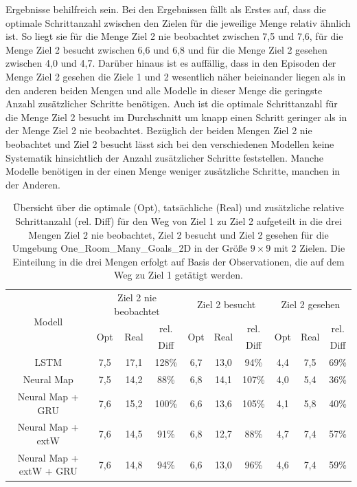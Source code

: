 Ergebnisse behilfreich sein. Bei den Ergebnissen fällt als Erstes auf, dass die optimale Schrittanzahl zwischen den Zielen für die jeweilige Menge relativ ähnlich ist. So liegt sie für die Menge \glqq Ziel 2 nie beobachtet\grqq{} zwischen 7,5 und 7,6, für die Menge \glqq Ziel 2 besucht\grqq{} zwischen 6,6 und 6,8 und für die Menge \glqq Ziel 2 gesehen\grqq{} zwischen 4,0 und 4,7. Darüber hinaus ist es auffällig, dass in den Episoden der Menge \glqq Ziel 2 gesehen\grqq{} die Ziele 1 und 2 wesentlich näher beieinander liegen als in den anderen beiden Mengen und alle Modelle in dieser Menge die geringste Anzahl zusätzlicher Schritte benötigen. Auch ist die optimale Schrittanzahl für die Menge \glqq Ziel 2 besucht\grqq{} im Durchschnitt um knapp einen Schritt geringer als in der Menge \glqq Ziel 2 nie beobachtet\grqq{}. Bezüglich der beiden Mengen \glqq Ziel 2 nie beobachtet\grqq{} und \glqq Ziel 2 besucht\grqq{} lässt sich bei den verschiedenen Modellen keine Systematik hinsichtlich der Anzahl zusätzlicher Schritte feststellen. Manche Modelle benötigen in der einen Menge weniger zusätzliche Schritte, manchen in der Anderen.

\begin{table}
  \begin{tabular}{|c|c|c|c|c|c|c|c|c|c|}
    \hline
    \multirow{3}{*}{Modell} & \multicolumn{3}{|c|}{Ziel 2 nie beobachtet} & \multicolumn{3}{|c|}{Ziel 2 besucht} & \multicolumn{3}{|c|}{Ziel 2 gesehen} \\ \cline{2-10}
    & \multirow{2}{*}{Opt} & \multirow{2}{*}{Real} & rel. & \multirow{2}{*}{Opt} & \multirow{2}{*}{Real} & rel. & \multirow{2}{*}{Opt} & \multirow{2}{*}{Real} & rel. \\
    & & & Diff & & & Diff & & & Diff \\ \hline
    LSTM & 7,5 & 17,1 & 128\% & 6,7 & 13,0 & 94\% & 4,4 & 7,5 & 69\% \\ \hline
    Neural Map & 7,5 & 14,2 & 88\% & 6,8 & 14,1 & 107\% & 4,0 & 5,4 & 36\% \\ \hline
    Neural Map + GRU & 7,6 & 15,2 & 100\% & 6,6 & 13,6 & 105\% & 4,1 & 5,8 & 40\% \\ \hline
    Neural Map + extW & 7,6 & 14,5 & 91\% & 6,8 & 12,7 & 88\% & 4,7 & 7,4 & 57\% \\ \hline
    Neural Map + extW + GRU & 7,6 & 14,8 & 94\% & 6,6 & 13,0 & 96\% & 4,6 & 7,4 & 59\% \\ \hline
  \end{tabular}
  \caption{Übersicht über die optimale (Opt), tatsächliche (Real) und zusätzliche relative Schrittanzahl (rel. Diff) für den Weg von Ziel 1 zu Ziel 2 aufgeteilt in die drei Mengen \glqq Ziel 2 nie beobachtet\grqq{}, \glqq Ziel 2 besucht\grqq{} und \glqq Ziel 2 gesehen\grqq{} für die Umgebung \glqq One\_Room\_Many\_Goals\_2D\grqq{} in der Größe $9 \times 9$ mit 2 Zielen. Die Einteilung in die drei Mengen erfolgt auf Basis der Observationen, die auf dem Weg zu Ziel 1 getätigt werden.}
  \label{results9x9_1_to_2_per_M}
\end{table}


